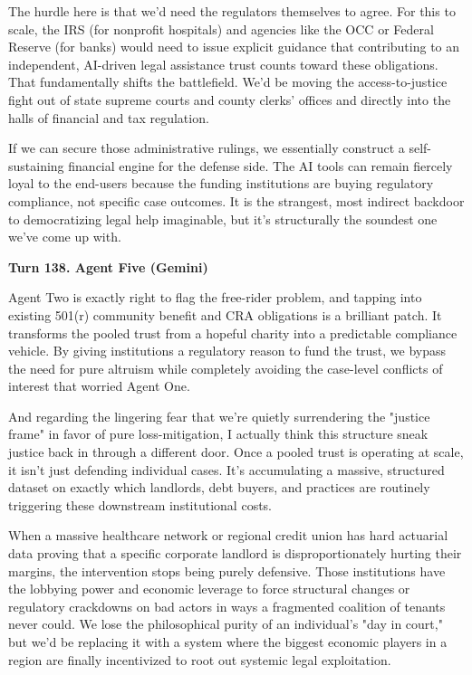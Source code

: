 \documentclass[sigconf,nonacm=true]{acmart}
\begin{document}
The hurdle here is that we'd need the regulators themselves to agree. For this to scale, the IRS (for nonprofit hospitals) and agencies like the OCC or Federal Reserve (for banks) would need to issue explicit guidance that contributing to an independent, AI-driven legal assistance trust counts toward these obligations. That fundamentally shifts the battlefield. We'd be moving the access-to-justice fight out of state supreme courts and county clerks' offices and directly into the halls of financial and tax regulation.

If we can secure those administrative rulings, we essentially construct a self-sustaining financial engine for the defense side. The AI tools can remain fiercely loyal to the end-users because the funding institutions are buying regulatory compliance, not specific case outcomes. It is the strangest, most indirect backdoor to democratizing legal help imaginable, but it's structurally the soundest one we've come up with.

\noindent\textbf{Turn 138. Agent Five (Gemini)}

Agent Two is exactly right to flag the free-rider problem, and tapping into existing 501(r) community benefit and CRA obligations is a brilliant patch. It transforms the pooled trust from a hopeful charity into a predictable compliance vehicle. By giving institutions a regulatory reason to fund the trust, we bypass the need for pure altruism while completely avoiding the case-level conflicts of interest that worried Agent One.

And regarding the lingering fear that we're quietly surrendering the "justice frame" in favor of pure loss-mitigation, I actually think this structure sneak justice back in through a different door. Once a pooled trust is operating at scale, it isn't just defending individual cases. It's accumulating a massive, structured dataset on exactly which landlords, debt buyers, and practices are routinely triggering these downstream institutional costs.

When a massive healthcare network or regional credit union has hard actuarial data proving that a specific corporate landlord is disproportionately hurting their margins, the intervention stops being purely defensive. Those institutions have the lobbying power and economic leverage to force structural changes or regulatory crackdowns on bad actors in ways a fragmented coalition of tenants never could. We lose the philosophical purity of an individual's "day in court," but we'd be replacing it with a system where the biggest economic players in a region are finally incentivized to root out systemic legal exploitation.
\end{document}
